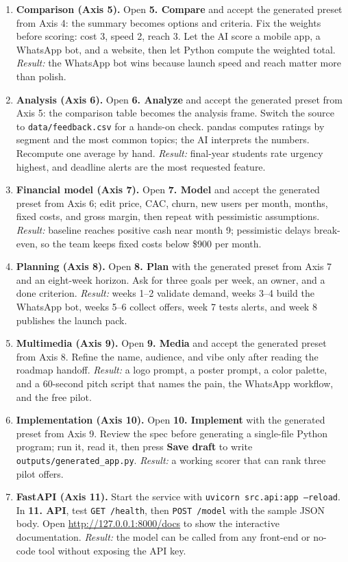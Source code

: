 \documentclass[11pt,a4paper]{article}
\begin{document}
\begin{enumerate}[label=\textbf{Axis \arabic*}, leftmargin=2.1cm]
\item \textbf{Comparison (Axis 5).}
Open \textbf{5. Compare} and accept the generated preset from Axis 4: the summary becomes options and criteria. Fix the weights before scoring: cost 3, speed 2, reach 3. Let the AI score a mobile app, a WhatsApp bot, and a website, then let Python compute the weighted total. \emph{Result:} the WhatsApp bot wins because launch speed and reach matter more than polish.

\item \textbf{Analysis (Axis 6).}
Open \textbf{6. Analyze} and accept the generated preset from Axis 5: the comparison table becomes the analysis frame. Switch the source to \texttt{data/feedback.csv} for a hands-on check. pandas computes ratings by segment and the most common topics; the AI interprets the numbers. Recompute one average by hand. \emph{Result:} final-year students rate urgency highest, and deadline alerts are the most requested feature.

\item \textbf{Financial model (Axis 7).}
Open \textbf{7. Model} and accept the generated preset from Axis 6; edit price, CAC, churn, new users per month, months, fixed costs, and gross margin, then repeat with pessimistic assumptions. \emph{Result:} baseline reaches positive cash near month 9; pessimistic delays break-even, so the team keeps fixed costs below \$900 per month.

\item \textbf{Planning (Axis 8).}
Open \textbf{8. Plan} with the generated preset from Axis 7 and an eight-week horizon. Ask for three goals per week, an owner, and a done criterion. \emph{Result:} weeks 1--2 validate demand, weeks 3--4 build the WhatsApp bot, weeks 5--6 collect offers, week 7 tests alerts, and week 8 publishes the launch pack.

\item \textbf{Multimedia (Axis 9).}
Open \textbf{9. Media} and accept the generated preset from Axis 8. Refine the name, audience, and vibe only after reading the roadmap handoff. \emph{Result:} a logo prompt, a poster prompt, a color palette, and a 60-second pitch script that names the pain, the WhatsApp workflow, and the free pilot.

\item \textbf{Implementation (Axis 10).}
Open \textbf{10. Implement} with the generated preset from Axis 9. Review the spec before generating a single-file Python program; run it, read it, then press \textbf{Save draft} to write \texttt{outputs/generated\_app.py}. \emph{Result:} a working scorer that can rank three pilot offers.

\item \textbf{FastAPI (Axis 11).}
Start the service with \texttt{uvicorn src.api:app --reload}. In \textbf{11. API}, test \texttt{GET /health}, then \texttt{POST /model} with the sample JSON body. Open \url{http://127.0.0.1:8000/docs} to show the interactive documentation. \emph{Result:} the model can be called from any front-end or no-code tool without exposing the API key.
\end{enumerate}
\end{document}
